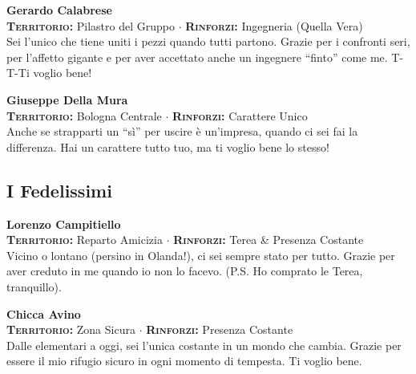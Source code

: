 \noindent\begin{minipage}{\linewidth}
\textbf{Gerardo Calabrese} \\
{\footnotesize \textbf{\textsc{Territorio:}} Pilastro del Gruppo $\cdot$ \textbf{\textsc{Rinforzi:}} Ingegneria (Quella Vera)} \\
Sei l'unico che tiene uniti i pezzi quando tutti partono. Grazie per i confronti seri, per l'affetto gigante e per aver accettato anche un ingegnere ``finto'' come me. T-T-Ti voglio bene!
\end{minipage}
\vspace{0.6cm}

\noindent\begin{minipage}{\linewidth}
\textbf{Giuseppe Della Mura} \\
{\footnotesize \textbf{\textsc{Territorio:}} Bologna Centrale $\cdot$ \textbf{\textsc{Rinforzi:}} Carattere Unico} \\
Anche se strapparti un ``sì'' per uscire è un'impresa, quando ci sei fai la differenza. Hai un carattere tutto tuo, ma ti voglio bene lo stesso!
\end{minipage}

\subsection*{I Fedelissimi}

\noindent\begin{minipage}{\linewidth}
\textbf{Lorenzo Campitiello} \\
{\footnotesize \textbf{\textsc{Territorio:}} Reparto Amicizia $\cdot$ \textbf{\textsc{Rinforzi:}} Terea \& Presenza Costante} \\
Vicino o lontano (persino in Olanda!), ci sei sempre stato per tutto. Grazie per aver creduto in me quando io non lo facevo. (P.S. Ho comprato le Terea, tranquillo).
\end{minipage}
\vspace{0.6cm}

\noindent\begin{minipage}{\linewidth}
\textbf{Chicca Avino} \\
{\footnotesize \textbf{\textsc{Territorio:}} Zona Sicura $\cdot$ \textbf{\textsc{Rinforzi:}} Presenza Costante} \\
Dalle elementari a oggi, sei l'unica costante in un mondo che cambia. Grazie per essere il mio rifugio sicuro in ogni momento di tempesta. Ti voglio bene.
\end{minipage}
\vspace{0.6cm}

